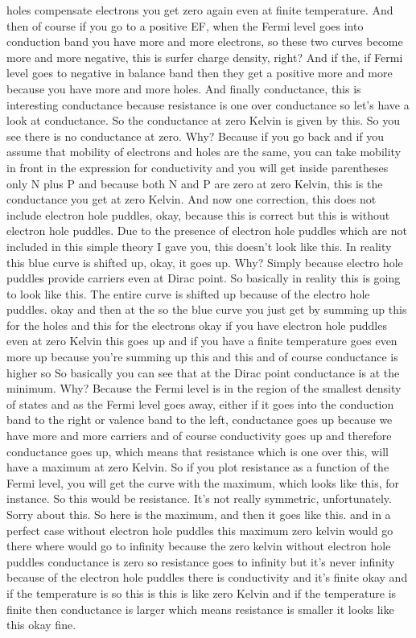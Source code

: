 holes compensate electrons you get zero again even at finite temperature. And then of course if you go to a positive EF, when the Fermi level goes into conduction band you have more and more electrons, so these two curves become more and more negative, this is surfer charge density, right? And if the, if Fermi level goes to negative in balance band then they get a positive more and more because you have more and more holes. And finally conductance, this is interesting conductance because resistance is one over conductance so let's have a look at conductance. So the conductance at zero Kelvin is given by this. So you see there is no conductance at zero. Why? Because if you go back and if you assume that mobility of electrons and holes are the same, you can take mobility in front in the expression for conductivity and you will get inside parentheses only N plus P and because both N and P are zero at zero Kelvin, this is the conductance you get at zero Kelvin. And now one correction, this does not include electron hole puddles, okay, because this is correct but this is without electron hole puddles. Due to the presence of electron hole puddles which are not included in this simple theory I gave you, this doesn't look like this. In reality this blue curve is shifted up, okay, it goes up. Why? Simply because electro hole puddles provide carriers even at Dirac point. So basically in reality this is going to look like this. The entire curve is shifted up because of the electro hole puddles. okay and then at the so the blue curve you just get by summing up this for the holes and this for the electrons okay if you have electron hole puddles even at zero Kelvin this goes up and if you have a finite temperature goes even more up because you're summing up this and this and of course conductance is higher so So basically you can see that at the Dirac point conductance is at the minimum. Why? Because the Fermi level is in the region of the smallest density of states and as the Fermi level goes away, either if it goes into the conduction band to the right or valence band to the left, conductance goes up because we have more and more carriers and of course conductivity goes up and therefore conductance goes up, which means that resistance which is one over this, will have a maximum at zero Kelvin. So if you plot resistance as a function of the Fermi level, you will get the curve with the maximum, which looks like this, for instance. So this would be resistance. It's not really symmetric, unfortunately. Sorry about this. So here is the maximum, and then it goes like this. and in a perfect case without electron hole puddles this maximum zero kelvin would go there where would go to infinity because the zero kelvin without electron hole puddles conductance is zero so resistance goes to infinity but it's never infinity because of the electron hole puddles there is conductivity and it's finite okay and if the temperature is so this is this is like zero Kelvin and if the temperature is finite then conductance is larger which means resistance is smaller it looks like this okay fine.
